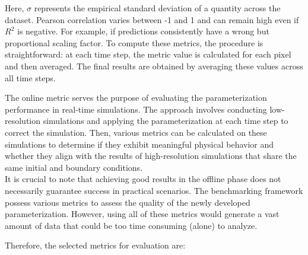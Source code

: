 Here, $\sigma$ represents the empirical standard deviation of a quantity across the dataset. Pearson correlation varies between -1 and 1 and can remain high even if $R^2$ is negative. For example, if predictions consistently have a wrong but proportional scaling factor. To compute these metrics, the procedure is straightforward: at each time step, the metric value is calculated for each pixel and then averaged. The final results are obtained by averaging these values across all time steps.

\vspace{0.2em}

The online metric serves the purpose of evaluating the parameterization performance in real-time simulations. The approach involves conducting low-resolution simulations and applying the parameterization at each time step to correct the simulation. Then, various metrics can be calculated on these simulations to determine if they exhibit meaningful physical behavior and whether they align with the results of high-resolution simulations that share the same initial and boundary conditions.\\

It is crucial to note that achieving good results in the offline phase does not necessarily guarantee success in practical scenarios. The benchmarking framework possess various metrics to assess the quality of the newly developed parameterization. However, using all of these metrics would generate a vast amount of data that could be too time consuming (alone) to analyze.

\newpage

Therefore, the selected metrics for evaluation are:

